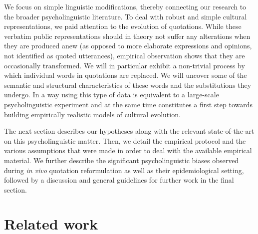 We focus on simple linguistic modifications, thereby connecting our research to the broader psycholinguistic literature.
To deal with robust and simple cultural representations, we paid attention to the evolution of quotations.
While these verbatim public representations should in theory not suffer any alterations when they are produced anew (as opposed to more elaborate expressions and opinions, not identified as quoted utterances), empirical observation shows that they are occasionally transformed.
We will in particular exhibit a non-trivial process by which individual words in quotations are replaced.
We will uncover some of the semantic and structural characteristics of these words and the substitutions they undergo.
In a way using this type of data is equivalent to a large-scale psycholinguistic experiment and at the same time constitutes a first step towards building empirically realistic models of cultural evolution.

The next section %
describes our hypotheses along with the relevant state-of-the-art on this psycholinguistic matter.
Then, we detail the empirical protocol and the various assumptions that were made in order to deal with the available empirical material.
We further describe the significant psycholinguistic biases observed during \emph{in vivo} quotation reformulation as well as their epidemiological setting, followed by a discussion and general guidelines for further work in the final section.%


\section{Related work} %
\label{sec:related}




